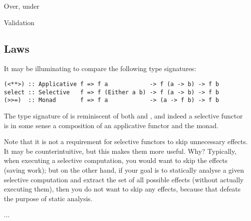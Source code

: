 Over, under

Validation

\subsection{Laws}\label{sec-laws}

It may be illuminating to compare the following type signatures:

\begin{verbatim}
(<**>) :: Applicative f => f a            -> f (a -> b) -> f b
select :: Selective   f => f (Either a b) -> f (a -> b) -> f b
(>>=)  :: Monad       f => f a            -> (a -> f b) -> f b
\end{verbatim}

The type signature of  is reminiscent of both \hs{<*>} and \hs{>>=},
and indeed a selective functor is in some sense a composition of an applicative
functor and the  monad.


Note that it is not a requirement for selective functors to skip unnecessary
effects. It may be counterintuitive, but this makes them more useful. Why?
Typically, when executing a selective computation, you would want to skip the
effects (saving work); but on the other hand, if your goal is to statically
analyse a given selective computation and extract the set of all possible
effects (without actually executing them), then you do not want to skip any
effects, because that defeats the purpose of static analysis.

...

